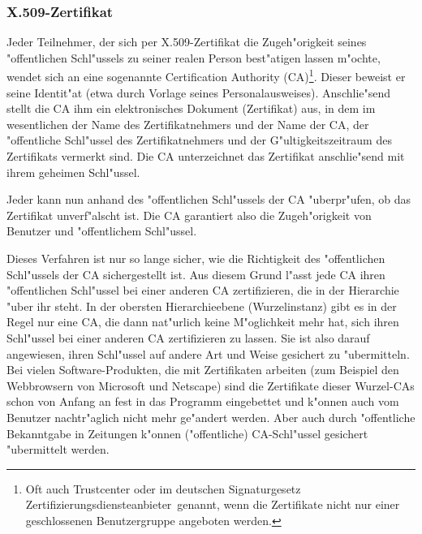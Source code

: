 \subsubsection{X.509-Zertifikat}
Jeder Teilnehmer, der sich per X.509-Zertifikat \cite{X.509}
die Zugeh"origkeit seines "offentlichen Schl"ussels zu seiner realen Person
best"atigen lassen m"ochte, wendet sich an eine sogenannte
 Certification Authority (CA)\footnote{%
Oft auch Trustcenter oder im deutschen Signaturgesetz
\glqq Zertifizierungsdiensteanbieter\grqq\ genannt, wenn die Zertifikate nicht
nur einer geschlossenen Benutzergruppe angeboten werden.
}.
Dieser beweist er seine Identit"at (etwa durch Vorlage seines 
Personalausweises). Anschlie"send stellt die CA ihm ein elektronisches
Dokument (Zertifikat) aus, in dem im wesentlichen der Name des 
Zertifikatnehmers und der Name der CA, der "offentliche Schl"ussel des 
Zertifikatnehmers und der G"ultigkeitszeitraum des Zertifikats vermerkt
sind. Die CA unterzeichnet das Zertifikat anschlie"send mit ihrem geheimen
Schl"ussel.
  
Jeder kann nun anhand des "offentlichen Schl"ussels der CA "uberpr"ufen, ob das Zertifikat unverf"alscht ist. Die
CA garantiert also die Zugeh"origkeit von Benutzer und "offentlichem Schl"ussel.

Dieses Verfahren ist nur so lange sicher, wie die Richtigkeit des "offentlichen Schl"ussels der CA
sichergestellt ist. Aus diesem Grund l"asst jede CA ihren "offentlichen Schl"ussel bei einer anderen CA
zertifizieren, die in der Hierarchie "uber ihr steht. In der obersten
Hierarchieebene (Wurzelinstanz) gibt es in der Regel
nur eine CA, die dann nat"urlich keine M"oglichkeit mehr hat, sich ihren Schl"ussel bei einer anderen CA
zertifizieren zu lassen. Sie ist also darauf angewiesen, ihren Schl"ussel auf andere Art und Weise gesichert
zu "ubermitteln. Bei vielen Software-Produkten, die mit Zertifikaten arbeiten (zum Beispiel den Webbrowsern
von Microsoft und Netscape) sind die Zertifikate dieser Wurzel-CAs schon von Anfang an fest in das Programm
eingebettet und k"onnen auch vom Benutzer nachtr"aglich nicht mehr ge"andert werden. Aber auch durch
"offentliche Bekanntgabe in Zeitungen k"onnen ("offentliche) CA-Schl"ussel
gesichert "ubermittelt werden.

